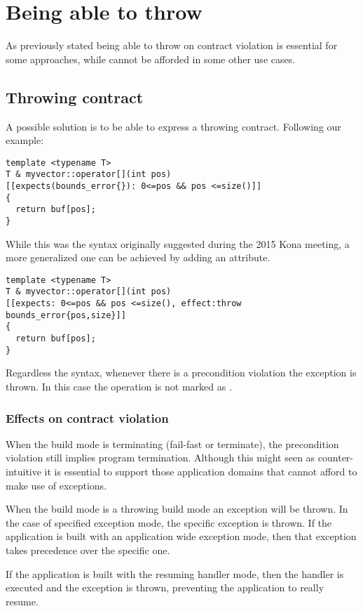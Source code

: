 \section{Being able to throw}

As previously stated being able to throw on contract violation is essential for
some approaches, while cannot be afforded in some other use cases. 

\subsection{Throwing contract}

A possible solution is to be able to express a throwing contract. Following our
example:

\begin{lstlisting}
template <typename T>
T & myvector::operator[](int pos)
[[expects(bounds_error{}): 0<=pos && pos <=size()]]
{
  return buf[pos];
}
\end{lstlisting}

While this was the syntax originally suggested during the 2015 Kona meeting, a
more generalized one can be achieved by adding an  attribute.

\begin{lstlisting}
template <typename T>
T & myvector::operator[](int pos)
[[expects: 0<=pos && pos <=size(), effect:throw bounds_error{pos,size}]]
{
  return buf[pos];
}
\end{lstlisting}

Regardless the syntax, whenever there is a precondition violation the exception
is thrown. In this case the operation is not marked as .

\subsubsection{Effects on contract violation}

When the build mode is terminating (fail-fast or terminate), the precondition
violation still implies program termination. Although this might seen as
counter-intuitive it is essential to support those application domains that
cannot afford to make use of exceptions.

When the build mode is a throwing build mode an exception will be thrown. In the
case of specified exception mode, the specific  exception
is thrown. If the application is built with an application wide exception mode,
then that exception takes precedence over the specific one.

If the application is built with the resuming handler mode, then the handler is
executed and the exception is thrown, preventing the application to really
resume.
